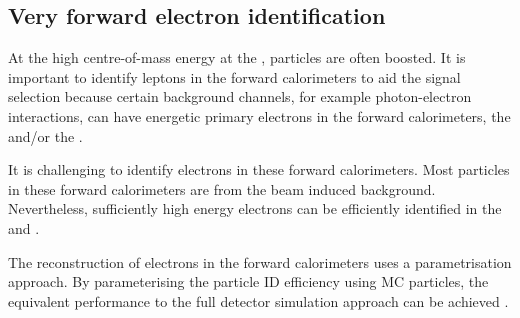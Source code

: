 \subsection{Very forward electron identification}
\label{sec:doubleHiggsForwardElectron}

At the high centre-of-mass energy at the \CLIC, particles are often boosted.  It is important to identify leptons in the forward calorimeters to aid the signal selection because  certain background channels, for example photon-electron interactions, can have energetic primary  electrons in  the forward calorimeters, the \LumiCAL and/or the \BeamCAL.

It is challenging to identify electrons in these forward calorimeters.  Most particles in these forward calorimeters are from the beam induced background. Nevertheless, sufficiently high energy electrons can be efficiently identified in the \BeamCAL   and \LumiCAL \cite{sailer2012radiation}.

The reconstruction of electrons in the forward calorimeters uses  a parametrisation approach.  By parameterising the  particle ID efficiency using MC particles, the equivalent performance to the full detector simulation approach can be achieved \cite{Sailer:2017onh,Lukic:forwardElectron} .




